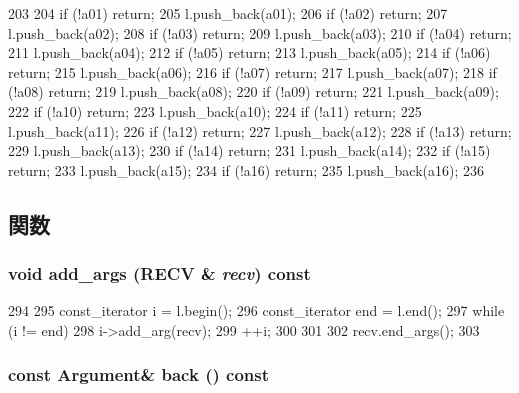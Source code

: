 \begin{DoxyCode}
203     {
204         if (!a01) return;
205         l.push_back(a01);
206         if (!a02) return;
207         l.push_back(a02);
208         if (!a03) return;
209         l.push_back(a03);
210         if (!a04) return;
211         l.push_back(a04);
212         if (!a05) return;
213         l.push_back(a05);
214         if (!a06) return;
215         l.push_back(a06);
216         if (!a07) return;
217         l.push_back(a07);
218         if (!a08) return;
219         l.push_back(a08);
220         if (!a09) return;
221         l.push_back(a09);
222         if (!a10) return;
223         l.push_back(a10);
224         if (!a11) return;
225         l.push_back(a11);
226         if (!a12) return;
227         l.push_back(a12);
228         if (!a13) return;
229         l.push_back(a13);
230         if (!a14) return;
231         l.push_back(a14);
232         if (!a15) return;
233         l.push_back(a15);
234         if (!a16) return;
235         l.push_back(a16);
236     }
\end{DoxyCode}


\subsection{関数}
\hypertarget{classVarArgs_1_1List_a558d5df5a983784e0e3e7b29f1d43fb1}{
\subsubsection[{add\_\-args}]{\setlength{\rightskip}{0pt plus 5cm}void add\_\-args (RECV \& {\em recv}) const}}
\label{classVarArgs_1_1List_a558d5df5a983784e0e3e7b29f1d43fb1}



\begin{DoxyCode}
294     {
295         const_iterator i = l.begin();
296         const_iterator end = l.end();
297         while (i != end) {
298             i->add_arg(recv);
299             ++i;
300         }
301 
302         recv.end_args();
303     }
\end{DoxyCode}
\hypertarget{classVarArgs_1_1List_a84709d74fae8987fcdd17aa8f1afe4b4}{
\subsubsection[{back}]{\setlength{\rightskip}{0pt plus 5cm}const {\bf Argument}\& back () const}}
\label{classVarArgs_1_1List_a84709d74fae8987fcdd17aa8f1afe4b4}



